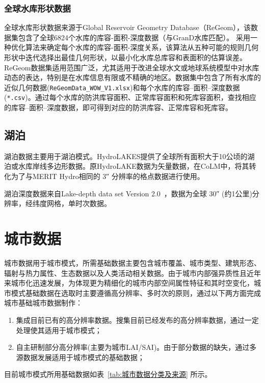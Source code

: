 \subsubsection{全球水库形状数据}

全球水库形状数据来源于Global Reservoir Geometry Database（ReGeom），该数据集包含了全球6824个水库的库容-面积-深度数据（与GranD水库匹配）。\citet{yigzaw2018new} 采用一种优化算法来确定每个水库的库容-面积-深度关系，该算法从五种可能的规则几何形状中迭代选择出最佳几何形状，以最小化水库总库容和表面积的估算误差。ReGeom数据集适用范围广泛，尤其适用于改进全球水文或地球系统模型中对水库动态的表达，特别是在水库信息有限或不精确的地区。数据集中包含了所有水库的近似几何数据(\texttt{ReGeomData\_WOW\_V1.xlsx})和每个水库的库容--面积--深度数据(\texttt{*.csv})。通过每个水库的防洪库容面积、正常库容面积和死库容面积，查找相应的库容--面积--深度数据，即可得到对应的防洪库容、正常库容和死库容。


\subsection{湖泊}
湖泊数据主要用于湖泊模式。HydroLAKES提供了全球所有面积大于10公顷的湖泊或水库岸线多边形数据\citep{messager2016nc}。原HydroLAKE数据为矢量数据，在CoLM中，将其转化为了与MERIT Hydro相同的 \ang{;;3} 分辨率的格点数据进行使用。

湖泊深度数据来自Lake-depth data set Version 2.0~\citep{kourzeneva2012global}，数据为全球 \ang{;;30} (约1公里)分辨率，经纬度网格，单时次数据。


\section{城市数据}\label{城市数据}
城市数据用于城市模式，所需基础数据主要包含城市覆盖、城市类型、建筑形态、辐射与热力属性、生态数据以及人类活动相关数据。由于城市内部强异质性且近年来城市化迅速发展，为体现更为精细化的城市内部空间属性特征和其时空变化，城市模式基础数据在选取时主要遵循高分辨率、多时次的原则，通过以下两方面完成城市基础城市数据制作：

\begin{enumerate}
\item 集成目前已有的高分辨率数据。搜集目前已经发布的高分辨率数据，通过一定处理使其适用于城市模式；
\item 自主研制部分高分辨率(主要为城市LAI/SAI)。由于部分数据的缺失，通过多源数据发展适用于城市模式的基础数据；
\end{enumerate}
目前城市模式所用基础数据如表~\ref{tab:城市数据分类及来源} 所示。


